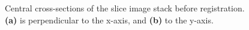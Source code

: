 	\begin{figure}
	  \centering
	  \caption{Central cross-sections of the slice image stack before registration. \textbf{(a)} is perpendicular to the x-axis, and \textbf{(b)} to the y-axis.}
	  \label{fig:geometric_initialisation}
	\end{figure}

